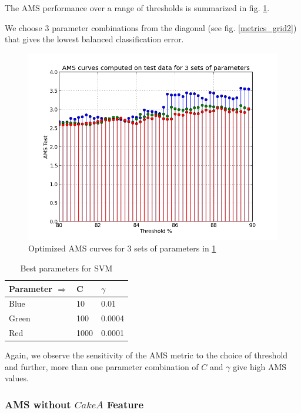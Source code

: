 \documentclass[final,3p,times,twocolumn]{elsarticle}
\begin{document}
The AMS performance over a range of thresholds is summarized in fig. \ref{AMSSVM}.

We choose 3 parameter combinations from the diagonal (see fig. \ref{metrics_grid2}) that gives the lowest balanced classification error.

\begin{figure}
\hspace{-0.3cm}
\includegraphics[scale=0.4]{Images/AMS_SVM_Optimum.png}
\caption{Optimized AMS curves for 3 sets of parameters in \ref{best}}
\label{AMSSVM}
\end{figure}

\begin{table}
\hspace{1.2cm}
\begin{tabular}{l|l|l}
Parameter $\Rightarrow$ & C & $\gamma$  \\
\toprule
Blue & 10 &  0.01\\
Green & 100 & 0.0004\\
Red &  1000  & 0.0001 \\
\end{tabular}
\caption{Best parameters for SVM}
\label{best}
\end{table}

Again, we observe the sensitivity of the AMS metric to the choice of threshold and further, more than one parameter combination of $C$ and $\gamma$ give high AMS values. 

\subsubsection{AMS without $CakeA$ Feature}
\end{document}

